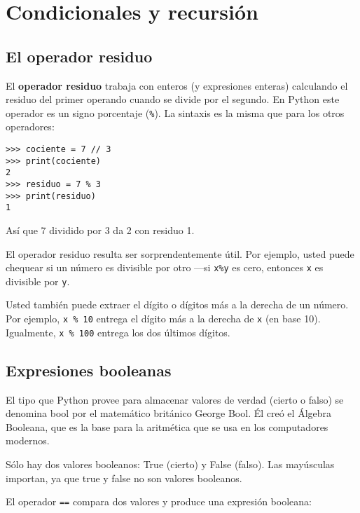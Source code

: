 
\chapter{Condicionales y recursión}

\section{El operador residuo}

 

El \textbf{operador residuo} trabaja con enteros (y expresiones enteras)
calculando el residuo del primer operando cuando se divide por el
segundo. En Python este operador es un signo porcentaje (\texttt{\%}).
La sintaxis es la misma que para los otros operadores:

\begin{lstlisting}
>>> cociente = 7 // 3
>>> print(cociente)
2
>>> residuo = 7 % 3
>>> print(residuo)
1
\end{lstlisting}

Así que 7 dividido por 3 da 2 con residuo 1.

El operador residuo resulta ser sorprendentemente útil. Por ejemplo,
usted puede chequear si un número es divisible por otro —si \texttt{x\%y}
es cero, entonces \texttt{x} es divisible por \texttt{y}.

Usted también puede extraer el dígito o dígitos más a la derecha de
un número. Por ejemplo, \texttt{x \% 10} entrega el dígito más a la
derecha de \texttt{x} (en base 10). Igualmente, \texttt{x \% 100}
entrega los dos últimos dígitos.

\section{Expresiones booleanas}

  

El tipo que Python provee para almacenar valores de verdad (cierto
o falso) se denomina bool por el matemático británico George Bool.
Él creó el Álgebra Booleana, que es la base para la aritmética que
se usa en los computadores modernos.

Sólo hay dos valores booleanos: True (cierto) y False (falso). Las
mayúsculas importan, ya que true y false no son valores booleanos.

El operador \texttt{==} compara dos valores y produce una expresión
booleana:


